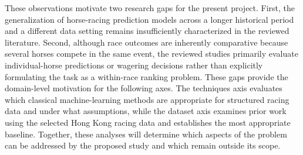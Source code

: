 These observations motivate two research gaps for the present project. First, the
generalization of horse-racing prediction models across a longer historical period
and a different data setting remains insufficiently characterized in the reviewed
literature. Second, although race outcomes are inherently comparative because
several horses compete in the same event, the reviewed studies primarily evaluate
individual-horse predictions or wagering decisions rather than explicitly
formulating the task as a within-race ranking problem. These gaps provide the
domain-level motivation for the following axes. The techniques axis evaluates
which classical machine-learning methods are appropriate for structured racing data
and under what assumptions, while the dataset axis examines prior work using the
selected Hong Kong racing data and establishes the most appropriate baseline.
Together, these analyses will determine which aspects of the problem can be
addressed by the proposed study and which remain outside its scope.
